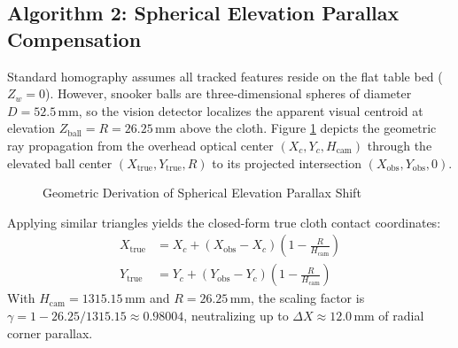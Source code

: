 \subsection{Algorithm 2: Spherical Elevation Parallax Compensation}
Standard homography assumes all tracked features reside on the flat table bed ($Z_w = 0$). However, snooker balls are three-dimensional spheres of diameter $D = 52.5\,\text{mm}$, so the vision detector localizes the apparent visual centroid at elevation $Z_{\text{ball}} = R = 26.25\,\text{mm}$ above the cloth. Figure \ref{fig:elevation_parallax} depicts the geometric ray propagation from the overhead optical center $(X_c, Y_c, H_{\text{cam}})$ through the elevated ball center $(X_{\text{true}}, Y_{\text{true}}, R)$ to its projected intersection $(X_{\text{obs}}, Y_{\text{obs}}, 0)$.

\begin{figure}[H]
\centering
{}
\caption{Geometric Derivation of Spherical Elevation Parallax Shift}
\label{fig:elevation_parallax}
\end{figure}

Applying similar triangles yields the closed-form true cloth contact coordinates:
\begin{align}
    X_{\text{true}} &= X_c + (X_{\text{obs}} - X_c) \left( 1 - \frac{R}{H_{\text{cam}}} \right) \label{eq:parallax_x} \\
    Y_{\text{true}} &= Y_c + (Y_{\text{obs}} - Y_c) \left( 1 - \frac{R}{H_{\text{cam}}} \right) \label{eq:parallax_y}
\end{align}
With $H_{\text{cam}} = 1315.15\,\text{mm}$ and $R = 26.25\,\text{mm}$, the scaling factor is $\gamma = 1 - 26.25/1315.15 \approx 0.98004$, neutralizing up to $\Delta X \approx 12.0\,\text{mm}$ of radial corner parallax.

